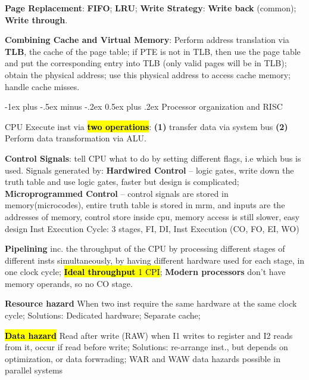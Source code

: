 \documentclass[a4paper]{article}
\makeatletter
\renewcommand{\section}{\@startsection{section}{1}{0mm}%
                                {-1ex plus -.5ex minus -.2ex}%
                                {0.5ex plus .2ex}%
                                {\normalfont\normalsize\bfseries}}
\makeatother
\begin{document}
\begin{multicols*}{2}
  \textbf{Page Replacement}: \textbf{FIFO}; \textbf{LRU}; \textbf{Write Strategy}: \textbf{Write back} (common); \textbf{Write through}.

  \textbf{Combining Cache and Virtual Memory}: Perform address translation via \textbf{TLB}, the cache of the page table; if PTE is not in TLB, then use the page table and put the corresponding entry into TLB (only valid pages will be in TLB); obtain the physical address; use this physical address to access cache memory; handle cache misses.

  \section{Processor organization and RISC}

  CPU Execute inst via \hl{\textbf{two operations}}: \textbf{(1)} transfer data via system bus \textbf{(2)} Perform data transformation via ALU.


  \textbf{Control Signals}: tell CPU what to do by setting different flags, i.e which bus is used. Signals generated by: \textbf{Hardwired Control} – logic gates, write down the truth table and use logic gates, faster but design is complicated; \textbf{Microprogrammed Control} – control signals are stored in memory(microcodes), entire truth table is stored in mrm, and inputs are the addresses of memory, control store inside cpu, memory access is still slower, easy design Inst Execution Cycle: 3 stages, FI, DI, Inst Execution (CO, FO, EI, WO)

  \textbf{Pipelining} inc. the throughput of the CPU by processing different stages of different insts simultaneously, by having different hardware used for each stage, in one clock cycle; \hl{\textbf{Ideal throughput} 1 CPI}; \textbf{Modern processors} don't have memory operands, so no CO stage.

  \textbf{Resource hazard} When two inst require the same hardware at the same clock cycle; Solutions: Dedicated hardware; Separate cache;

  \hl{\textbf{Data hazard}} Read after write (RAW) when I1 writes to register and I2 reads from it, occur if read before write; Solutions: re-arrange inst., but depends on optimization, or data forwrading; WAR and WAW data hazards possible in parallel systems


\end{multicols*}
\end{document}
